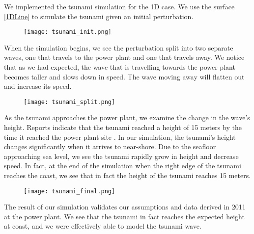 \documentclass[../main.tex]{subfiles}
\begin{document}
We implemented the tsunami simulation for the 1D case.  We use the surface \ref{1DLine} to simulate the tsunami given an initial perturbation. 

\begin{figure}[H]
\centering
\texttt{[image: tsunami\_init.png]}
\end{figure}

When the simulation begins, we see the perturbation split into two separate waves, one that travels to the power plant and one that travels away.  We notice that as we had expected, the wave that is travelling towards the power plant becomes taller and slows down in speed.  The wave moving away will flatten out and increase its speed.  

\begin{figure}[H]
\centering
\texttt{[image: tsunami\_split.png]}
\end{figure}


As the tsunami approaches the power plant, we examine the change in the wave's height.  Reports indicate that the tsunami reached a height of 15 meters by the time it reached the power plant site \cite{nuclearAssociation}.  In our simulation, the tsunami's height changes significantly when it arrives to near-shore.  Due to the seafloor approaching sea level, we see the tsunami rapidly grow in height and decrease speed.  In fact, at the end of the simulation when the right edge of the tsunami
reaches the coast, we see that in fact the height of the tsunami reaches 15 meters.

\begin{figure}[H]
\centering
\texttt{[image: tsunami\_final.png]}
\end{figure}

The result of our simulation validates our assumptions and data derived in 2011 at the power plant.  We see that the tsunami in fact reaches the expected height at coast, and we were effectively able to model the tsunami wave.
\end{document}
